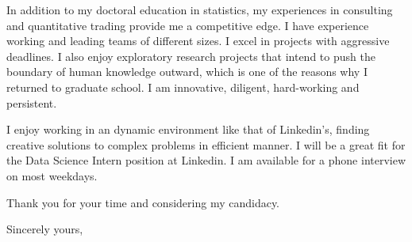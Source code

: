 \documentclass{letter} %
\begin{document}
\begin{letter}
In addition to my doctoral education in statistics, my experiences in consulting and quantitative trading provide me a competitive edge. I have experience working and leading teams of different sizes. I excel in projects with aggressive deadlines. I also enjoy exploratory research projects that intend to push the boundary of human knowledge outward, which is one of the reasons why I returned to graduate school. I am innovative, diligent, hard-working and persistent. 

\noindent %
I enjoy working in an dynamic environment like that of Linkedin's, finding creative solutions to complex problems in efficient manner. I will be a great fit for the Data Science Intern position at Linkedin. I am available for a phone interview on most weekdays. 

Thank you for your time and considering my candidacy. 
 
\closing{Sincerely yours,} 
 

 

\end{letter}
\end{document}

